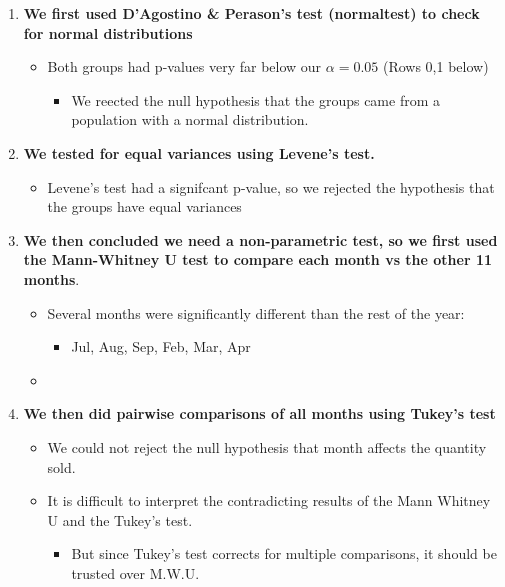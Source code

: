 \documentclass[11pt]{article}
\providecommand{\tightlist}{%
      \setlength{\itemsep}{0pt}\setlength{\parskip}{0pt}}
\begin{document}
\begin{enumerate}
\def\labelenumi{\arabic{enumi}.}
\tightlist
\item
  \textbf{We first used D'Agostino \& Perason's test (normaltest) to
  check for normal distributions}

  \begin{itemize}
  \tightlist
  \item
    Both groups had p-values very far below our \(\alpha=0.05\) (Rows
    0,1 below)

    \begin{itemize}
    \tightlist
    \item
      We reected the null hypothesis that the groups came from a
      population with a normal distribution.
    \end{itemize}
  \end{itemize}
\item
  \textbf{We tested for equal variances using Levene's test. }

  \begin{itemize}
  \tightlist
  \item
    Levene's test had a signifcant p-value, so we rejected the
    hypothesis that the groups have equal variances
  \end{itemize}
\item
  \textbf{We then concluded we need a non-parametric test, so we first
  used the Mann-Whitney U test to compare each month vs the other 11
  months}.

  \begin{itemize}
  \item
    Several months were significantly different than the rest of the
    year:

    \begin{itemize}
    \tightlist
    \item
      Jul, Aug, Sep, Feb, Mar, Apr
    \end{itemize}
  \item
  \end{itemize}
\item
  \textbf{We then did pairwise comparisons of all months using Tukey's
  test}

  \begin{itemize}
  \tightlist
  \item
    We could not reject the null hypothesis that month affects the
    quantity sold.
  \item
    It is difficult to interpret the contradicting results of the Mann
    Whitney U and the Tukey's test.

    \begin{itemize}
    \tightlist
    \item
      But since Tukey's test corrects for multiple comparisons, it
      should be trusted over M.W.U.
    \end{itemize}
  \end{itemize}
\end{enumerate}
\end{document}
